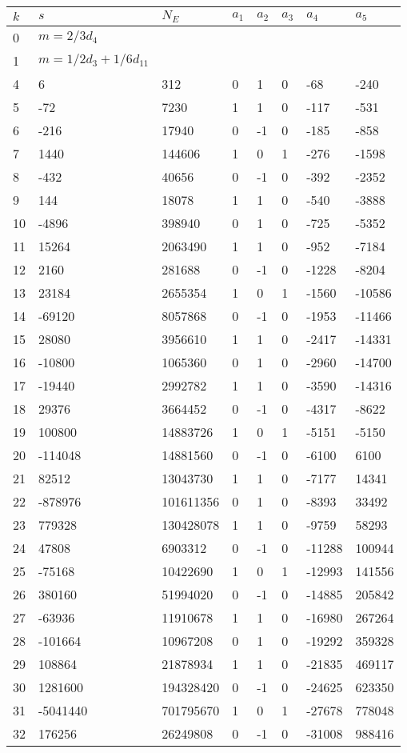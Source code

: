 \documentclass{amsart}
\begin{document}
\begin{longtable}{|l|l|l|lllll|}
\hline
$k$ & $s$ & $N_E$ & $a_1$ & $a_2$ & $a_3$ & $a_4$ & $a_5$\\
\hline
0&$m=2/3d_{4}$&&\multicolumn{5}{c|}{}\\
1&$m=1/2d_{3}+1/6d_{11}$&&\multicolumn{5}{c|}{}\\
4&6&312&0&1&0&-68&-240\\
5&-72&7230&1&1&0&-117&-531\\
6&-216&17940&0&-1&0&-185&-858\\
7&1440&144606&1&0&1&-276&-1598\\
8&-432&40656&0&-1&0&-392&-2352\\
9&144&18078&1&1&0&-540&-3888\\
10&-4896&398940&0&1&0&-725&-5352\\
11&15264&2063490&1&1&0&-952&-7184\\
12&2160&281688&0&-1&0&-1228&-8204\\
13&23184&2655354&1&0&1&-1560&-10586\\
14&-69120&8057868&0&-1&0&-1953&-11466\\
15&28080&3956610&1&1&0&-2417&-14331\\
16&-10800&1065360&0&1&0&-2960&-14700\\
17&-19440&2992782&1&1&0&-3590&-14316\\
18&29376&3664452&0&-1&0&-4317&-8622\\
19&100800&14883726&1&0&1&-5151&-5150\\
20&-114048&14881560&0&-1&0&-6100&6100\\
21&82512&13043730&1&1&0&-7177&14341\\
22&-878976&101611356&0&1&0&-8393&33492\\
23&779328&130428078&1&1&0&-9759&58293\\
24&47808&6903312&0&-1&0&-11288&100944\\
25&-75168&10422690&1&0&1&-12993&141556\\
26&380160&51994020&0&-1&0&-14885&205842\\
27&-63936&11910678&1&1&0&-16980&267264\\
28&-101664&10967208&0&1&0&-19292&359328\\
29&108864&21878934&1&1&0&-21835&469117\\
30&1281600&194328420&0&-1&0&-24625&623350\\
31&-5041440&701795670&1&0&1&-27678&778048\\
32&176256&26249808&0&-1&0&-31008&988416\\

\end{longtable}
\end{document}
